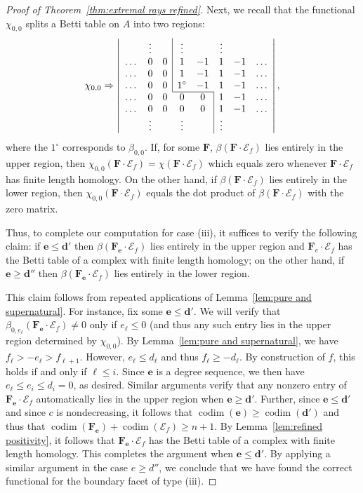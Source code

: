 \documentclass[12pt]{amsart}
\theoremstyle{definition}
\theoremstyle{remark}
\newcommand{\codim}{\operatorname{codim}}
\newcommand{\cc}{c}
\newcommand{\dd}{\mathbf{d}}
\newcommand{\ee}{\mathbf{e}}
\newcommand{\cE}{\mathcal{E}}
\newcommand{\FF}{\mathbf{F}}
\begin{document}
\begin{proof}[Proof of Theorem~\ref{thm:extremal rays refined}]
Next, we recall that the functional $\chi_{0,0}$ splits a Betti table on $A$ into two regions:
\[
\chi_{0,0}\Rightarrow 
\left|
\begin{array}{cccccccc}
 & \vdots& &\multicolumn{1}{|c}{\vdots}&& \vdots&&\\
\dots&0&0&\multicolumn{1}{|c}{1}&-1&1&-1&\dots\\
\dots&0&0&\multicolumn{1}{|c}{1}&-1&1&-1&\dots\\
\dots&0&0&\multicolumn{1}{|c}{1^\circ}&-1&1&-1&\dots\\ \cline{4-5}
\dots&0&0&0&0&\multicolumn{1}{|c}{1}&-1&\dots\\
\dots&0&0&0&0&\multicolumn{1}{|c}{1}&-1&\dots\\
& \vdots&&\vdots&& \multicolumn{1}{|c}{\vdots}&&\\
\end{array}
\right|,
\]
where the $1^\circ$ corresponds to $\beta_{0,0}$.   If, for some $\FF$, $\beta(\FF\cdot \cE_f)$ lies entirely in the upper region, then $\chi_{0,0}(\FF\cdot \cE_f)=\chi(\FF\cdot \cE_f)$ which equals zero whenever $\FF\cdot \cE_f$ has finite length homology.  On the other hand, if $\beta(\FF\cdot \cE_f)$ lies entirely in the lower region, then $\chi_{0,0}(\FF\cdot \cE_f)$ equals the dot product of $\beta(\FF\cdot \cE_f)$ with the zero matrix.

Thus, to complete our computation for case (iii), it suffices to verify the following claim: if $\ee\leq \dd'$ then $\beta(\FF_{\ee}\cdot \cE_f)$ lies entirely in the upper region and $\FF_e\cdot \cE_f$ has the Betti table of a complex with finite length homology; on the other hand, if $\ee\geq \dd''$ then $\beta(\FF_{\ee}\cdot \cE_f)$ lies entirely in the lower region.  

This claim follows from repeated applications of Lemma~\ref{lem:pure and supernatural}.  For instance, fix some $\ee\leq \dd'$.  We will verify that $\beta_{0,e_\ell}(\FF_{\ee}\cdot \cE_f)\ne 0$ only if $e_{\ell}\leq 0$ (and thus any such entry lies in the upper region determined by $\chi_{0,0}$).  By Lemma~\ref{lem:pure and supernatural}, we have
$
f_{\ell}>-e_{\ell}>f_{\ell+1}.
$
However, $e_{\ell}\leq d_{\ell}$ and thus $f_{\ell}\geq -d_{\ell}$.  By construction of $f$, this holds if and only if $\ell \leq i$.  Since $\ee$ is a degree sequence, we then have $e_{\ell}\leq e_i\leq d_i=0$, as desired.  Similar arguments verify that any nonzero entry of $\FF_{\ee}\cdot \cE_f$ automatically lies in the upper region when $\ee\geq \dd'$. Further, since $\ee\leq \dd'$ and since $\cc$ is nondecreasing, it follows that $\codim(\ee)\geq \codim(\dd')$ and thus that $\codim(\FF_{\ee})+\codim(\cE_f)\geq n+1$.  By Lemma~\ref{lem:refined positivity}, it follows that $\FF_{\ee}\cdot \cE_f$ has the Betti table of a complex with finite length homology.  This completes the argument when $\ee\leq \dd'$.  By applying a similar argument in the case $e\geq d''$, we conclude that we have found the correct functional for the boundary facet of type (iii).


\end{proof}
\end{document}
